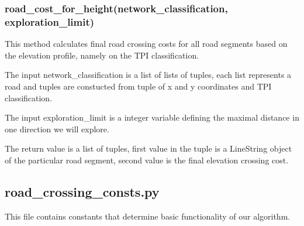 \documentclass[oneside]{article}
\begin{document}
            \subsubsection{road\_cost\_for\_height(network\_classification, exploration\_limit)}
            This method calculates final road crossing costs for all road segments based on the elevation profile, namely on the TPI classification.

            The input network\_classification is a list of lists of tuples, each list represents a road and tuples are constucted from tuple of x and y coordinates and TPI classification.

            The input exploration\_limit is a integer variable defining the maximal distance in one direction we will explore.

            The return value is a list of tuples, first value in the tuple is a LineString object of the particular road segment, second value is the final elevation crossing cost.

        \subsection{road\_crossing\_consts.py}
        This file contains constants that determine basic functionality of our algorithm.
\end{document}

